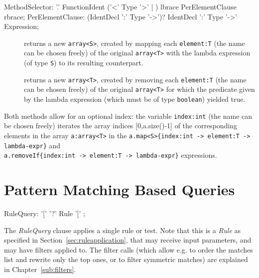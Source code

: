 \begin{rail}
  MethodSelector: '.' FunctionIdent ('<' Type '>' | ) lbrace PerElementClause rbrace;
  PerElementClause: (IdentDecl ':' Type '->')? IdentDecl ':' Type '->' Expression;
\end{rail}

\begin{description}
\item[] returns a new \texttt{array<S>},
   created by mapping each \texttt{element:T} (the name can be chosen freely) of the original \texttt{array<T>} with the lambda expression (of type \texttt{S}) to its resulting counterpart.
\item[] returns a new \texttt{array<T>},
   created by removing each \texttt{element:T} (the name can be chosen freely) of the original \texttt{array<T>} for which the predicate given by the lambda expression (which must be of type \texttt{boolean}) yielded true.
\end{description}

Both methods allow for an optional index: the variable \texttt{index:int} (the name can be chosen freely) iterates the array indices [0,a.size()-1] of the corresponding elements in the array \texttt{a:array<T>} in the \verb#a.map<S>{index:int -> element:T -> lambda-expr}# and \\ \verb#a.removeIf{index:int -> element:T -> lambda-expr}# expressions.


\section{Pattern Matching Based Queries}\label{sec:patternbasedgraphquery}

\begin{rail}
  RuleQuery: '[' '?' Rule ']' ;
\end{rail}

The \emph{RuleQuery} clause applies a single rule or test.
Note that this is a \emph{Rule} as specified in Section~\ref{sec:ruleapplication}, that may receive input parameters, and may have filters applied to.
The filter calls (which allow e.g. to order the matches list and rewrite only the top ones, or to filter symmetric matches) are explained in Chapter~\ref{sub:filters}.


